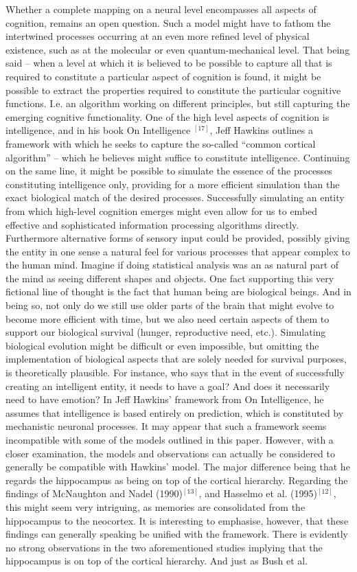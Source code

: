 Whether a complete mapping on a neural level encompasses all aspects of cognition, remains an open question. Such a model might have to fathom the intertwined processes occurring at an even more refined level of physical existence, such as at the molecular or even quantum-mechanical level. That being said – when a level at which it is believed to be possible to capture all that is required to constitute a particular aspect of cognition is found, it might be possible to extract the properties required to constitute the particular cognitive functions. I.e. an algorithm working on different principles, but still capturing the emerging cognitive functionality. One of the high level aspects of cognition is intelligence, and in his book On Intelligence $^{[17]}$, Jeff Hawkins outlines a framework with which he seeks to capture the so-called “common cortical algorithm” – which he believes might suffice to constitute intelligence. Continuing on the same line, it might be possible to simulate the essence of the processes constituting intelligence only, providing for a more efficient simulation than the exact biological match of the desired processes. Successfully simulating an entity from which high-level cognition emerges might even allow for us to embed effective and sophisticated information processing algorithms directly. Furthermore alternative forms of sensory input could be provided, possibly giving the entity in one sense a natural feel for various processes that appear complex to the human mind. Imagine if doing statistical analysis was an as natural part of the mind as seeing different shapes and objects. One fact supporting this very fictional line of thought is the fact that human being are biological beings. And in being so, not only do we still use older parts of the brain that might evolve to become more efficient with time, but we also need certain aspects of them to support our biological survival (hunger, reproductive need, etc.). Simulating biological evolution might be difficult or even impossible, but omitting the implementation of biological aspects that are solely needed for survival purposes, is theoretically plausible. For instance, who says that in the event of successfully creating an intelligent entity, it needs to have a goal? And does it necessarily need to have emotion? In Jeff Hawkins’ framework from On Intelligence, he assumes that intelligence is based entirely on prediction, which is constituted by mechanistic neuronal processes. It may appear that such a framework seems incompatible with some of the models outlined in this paper. However, with a closer examination, the models and observations can actually be considered to generally be compatible with Hawkins’ model. The major difference being that he regards the hippocampus as being on top of the cortical hierarchy. Regarding the findings of McNaughton and Nadel (1990)$^{[13]}$, and Hasselmo et al. (1995)$^{[12]}$, this might seem very intriguing, as memories are consolidated from the hippocampus to the neocortex. It is interesting to emphasise, however, that these findings can generally speaking be unified with the framework. There is evidently no strong observations in the two aforementioned studies implying that the hippocampus is on top of the cortical hierarchy. And just as Bush et al. 